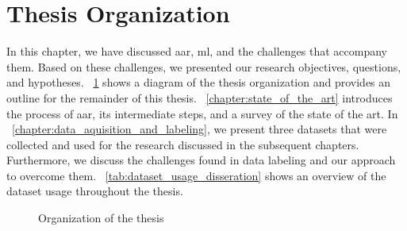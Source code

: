 \section{Thesis Organization}
\label{sec:intro_thesis_organization}

In this chapter, we have discussed \acrfull{aar}, \acrfull{ml}, and the challenges that accompany them.
Based on these challenges, we presented our research objectives, questions, and hypotheses.
\figurename~\ref{fig:intro_thesis_organization} shows a diagram of the thesis organization and provides an outline for the remainder of this thesis.
\chaptername~\ref{chapter:state_of_the_art} introduces the process of \gls{aar}, its intermediate steps, and a survey of the state of the art.
In \chaptername~\ref{chapter:data_aquisition_and_labeling}, we present three datasets that were collected and used for the research discussed in the subsequent chapters.
Furthermore, we discuss the challenges found in data labeling and our approach to overcome them.
\tablename~\ref{tab:dataset_usage_disseration} shows an overview of the dataset usage throughout the thesis.




\begin{figure}[hb!]
    \centering
    \caption{Organization of the thesis}
    \label{fig:intro_thesis_organization}
\end{figure}



